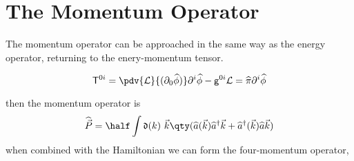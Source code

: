 \section{The Momentum Operator}
\label{sec:momentum-operator}

The momentum operator can be approached in the same way as the energy
operator, returning to the enery-momentum tensor.

\begin{equation}
  \label{eq:35}
  \ten{T}{^{0i}} = \pdv{\Lag}{(\partial_0 \Op{\phi})} \partial^i \Op{\phi} - \ten{g}{^{0i}} \Lag = \Op{\pi} \partial^i \Op{\phi}
\end{equation}

then the momentum operator is
\begin{equation}
  \label{eq:36}
  \Op{\vec{P}} = \half \int \nm{k} \vec{k} \qty( \Op{a}(\vec{k}) \hOp{a}{\vec{k}} + \hOp{a}(\vec{k}) \Op{a}{\vec{k}} )
\end{equation}
when combined with the Hamiltonian we can form the four-momentum operator,

